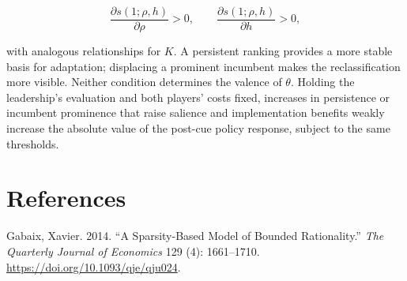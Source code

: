 \documentclass[
  11pt,
]{article}
\newlength{\cslhangindent}
\newenvironment{CSLReferences}[2] %
 {\begin{list}{}{%
  \setlength{\itemindent}{0pt}
  \setlength{\leftmargin}{0pt}
  \setlength{\parsep}{0pt}
  \ifodd #1
   \setlength{\leftmargin}{\cslhangindent}
   \setlength{\itemindent}{-1\cslhangindent}
  \fi
  \setlength{\itemsep}{#2\baselineskip}}}
 {\end{list}}
\theoremstyle{definition}
\begin{document}
\[
\frac{\partial s(1;\rho,h)}{\partial\rho}>0,
\qquad
\frac{\partial s(1;\rho,h)}{\partial h}>0,
\]

with analogous relationships for \(K\). A persistent ranking provides a
more stable basis for adaptation; displacing a prominent incumbent makes
the reclassification more visible. Neither condition determines the
valence of \(\theta\). Holding the leadership's evaluation and both
players' costs fixed, increases in persistence or incumbent prominence
that raise salience and implementation benefits weakly increase the
absolute value of the post-cue policy response, subject to the same
thresholds.

\section*{References}\label{references}

\protect{}\label{refs}
\begin{CSLReferences}{1}{0}
Gabaix, Xavier. 2014. {``A Sparsity-Based Model of Bounded
Rationality.''} \emph{The Quarterly Journal of Economics} 129 (4):
1661--1710. \url{https://doi.org/10.1093/qje/qju024}.

\end{CSLReferences}
\end{document}

